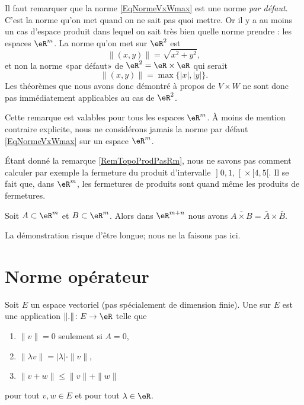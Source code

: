 \begin{remark}		\label{RemTopoProdPasRm}
	Il faut remarquer que la norme \eqref{EqNormeVxWmax} est une norme \emph{par défaut}. C'est la norme qu'on met quand on ne sait pas quoi mettre. Or il y a au moins un cas d'espace produit dans lequel on sait très bien quelle norme prendre : les espaces $\eR^m$. La norme qu'on met sur $\eR^2$ est
	\begin{equation}
		\| (x,y) \|=\sqrt{x^2+y^2},
	\end{equation}
	et non la norme «par défaut» de $\eR^2=\eR\times\eR$ qui serait
	\begin{equation}
		\| (x,y) \|=\max\{ | x |,| y | \}.
	\end{equation}
	Les théorèmes que nous avons donc démontré à propos de $V\times W$ ne sont donc pas immédiatement applicables au cas de $\eR^2$.

	Cette remarque est valables pour tous les espaces $\eR^m$. À moins de mention contraire explicite, nous ne considérons jamais la norme par défaut \eqref{EqNormeVxWmax} sur un espace $\eR^m$.
\end{remark}

Étant donné la remarque \ref{RemTopoProdPasRm}, nous ne savons pas comment calculer par exemple la fermeture du produit d'intervalle $\mathopen] 0,1 ,  \mathclose[\times\mathopen[ 4 , 5 [$. Il se fait que, dans $\eR^m$, les fermetures de produits sont quand même les produits de fermetures.

\begin{proposition}		\label{PropovlAxBbarAbraB}
	Soit $A\subset\eR^m$ et $B\subset\eR^m$. Alors dans $\eR^{m+n}$ nous avons $\overline{ A\times B }=\bar A\times \bar B$.
\end{proposition}

La démonstration risque d'être longue; nous ne la faisons pas ici.

\section{Norme opérateur}
\label{SeckwyQjK}


Soit \( E\) un espace vectoriel (pas spécialement de dimension finie). Une   sur $E$ est une application $\| . \|\colon E\to \eR$ telle que
\begin{enumerate}
		\label{PgDefNorme}
	\item
		$\| v \|=0$ seulement si $A=0$,
	\item
		$\| \lambda v \|=| \lambda |\cdot\| v \|$,
	\item
		$\| v+w \|\leq\| v \|+\| w \|$

\end{enumerate}
pour tout $v,w\in E$ et pour tout $\lambda\in\eR$.

